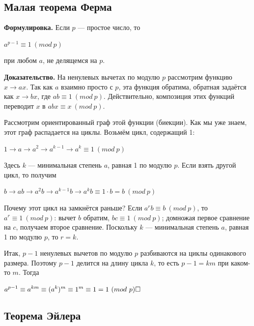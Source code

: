 \documentclass[a4paper, 10pt]{article}
\begin{document}
\subsection{Малая теорема Ферма}

\textbf{Формулировка.} Если $p$ — простое число, то

\begin{center}
    $\displaystyle a^{p - 1} \equiv 1 \ (mod \ p)$
\end{center}

при любом $a$, не делящемся на $p$.

\textbf{Доказательство.} На ненулевых вычетах по модулю $p$ рассмотрим функцию $x \to ax$. Так как $a$ взаимно просто с $p$, эта функция обратима, обратная задаётся как $x \to bx$, где $ab \equiv 1 \ (mod \ p)$. Действительно, композиция этих функций переводит $x$ в $a b x \equiv x \ (mod \ p)$.

Рассмотрим ориентированный граф этой функции (биекции). Как мы уже знаем, этот граф распадается на циклы. Возьмём цикл, содержащий 1:

\begin{center}
    $\displaystyle 1 \to a \to a^2 \to a^{k - 1} \to a^k \equiv 1 \ (mod \ p)$
\end{center}

Здесь $k$ — минимальная степень $a$, равная 1 по модулю $p$. Если взять другой цикл, то получим

\begin{center}
    $\displaystyle b \to a b \to a^2 b \to a^{k - 1} b \to a^k b \equiv 1 \cdot b = b \ (mod \ p)$
\end{center}

Почему этот цикл на замкнётся раньше? Если $a^r b \equiv b \ (mod \ p)$, то $a^r \equiv 1 \ (mod \ p)$: вычет $b$ обратим, $b c \equiv 1 \ (mod \ p)$; домножая первое сравнение на $c$, получаем второе сравнение. Поскольку $k$ — минимальная степень $a$, равная 1 по модулю $p$, то $r = k$.

Итак, $p - 1$ ненулевых вычетов по модулю $p$ разбиваются на циклы одинакового размера. Поэтому $p - 1$ делится на длину цикла $k$, то есть $p - 1 = k m$ при каком-то $m$. Тогда

\begin{center}
    $\displaystyle a^{p - 1} \equiv a^{km} \equiv (a^k)^m \equiv 1^m \equiv 1 = 1 \ (mod \ p) \hfill \square$
\end{center}

\subsection{Теорема Эйлера}
\end{document}
